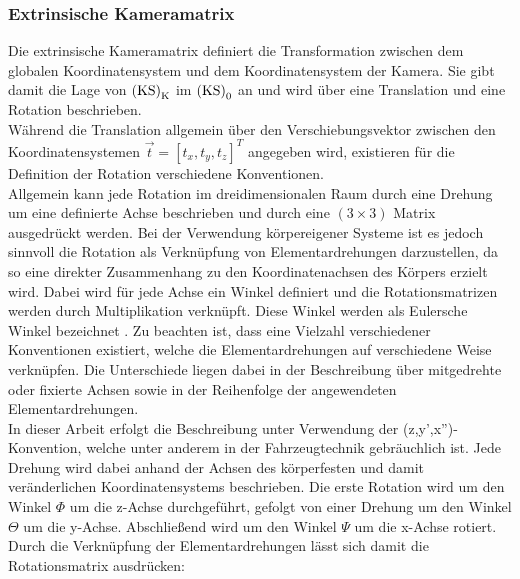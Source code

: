 
\subsubsection{Extrinsische Kameramatrix}
Die extrinsische Kameramatrix definiert die Transformation zwischen dem globalen Koordinatensystem und dem Koordinatensystem der Kamera. Sie gibt damit die Lage von ${\mathrm{(KS)}}_{\mathrm{K}}$ im ${\mathrm{(KS)}}_{\mathrm{0}}$ an und wird über eine Translation und eine Rotation beschrieben.\\
Während die Translation allgemein über den Verschiebungsvektor zwischen den Koordinatensystemen $\vec{t} = [t_x, t_y, t_z]^T$ angegeben wird, existieren für die Definition der Rotation verschiedene Konventionen.\\

Allgemein kann jede Rotation im dreidimensionalen Raum durch eine Drehung um eine definierte Achse beschrieben und durch eine $(3 \times 3)$ Matrix ausgedrückt werden. Bei der Verwendung körpereigener Systeme ist es jedoch sinnvoll die Rotation als Verknüpfung von Elementardrehungen darzustellen, da so eine direkter Zusammenhang zu den Koordinatenachsen des Körpers erzielt wird. Dabei wird für jede Achse ein Winkel definiert und die Rotationsmatrizen werden durch Multiplikation verknüpft. Diese Winkel werden als Eulersche Winkel bezeichnet \cite{Foley1990}. Zu beachten ist, dass eine Vielzahl verschiedener Konventionen existiert, welche die Elementardrehungen auf verschiedene Weise verknüpfen. Die Unterschiede liegen dabei in der Beschreibung über mitgedrehte oder fixierte Achsen sowie in der Reihenfolge der angewendeten Elementardrehungen. \\

In dieser Arbeit erfolgt die Beschreibung unter Verwendung der (z,y',x'')-Konvention, welche unter anderem in der Fahrzeugtechnik gebräuchlich ist. Jede Drehung wird dabei anhand der Achsen des körperfesten und damit veränderlichen Koordinatensystems beschrieben. Die erste Rotation wird um den Winkel $\Phi$ um die z-Achse durchgeführt, gefolgt von einer Drehung um den Winkel $\Theta$ um die y-Achse. Abschließend wird um den Winkel $\Psi$ um die x-Achse rotiert. Durch die Verknüpfung der Elementardrehungen lässt sich damit die Rotationsmatrix ausdrücken:

